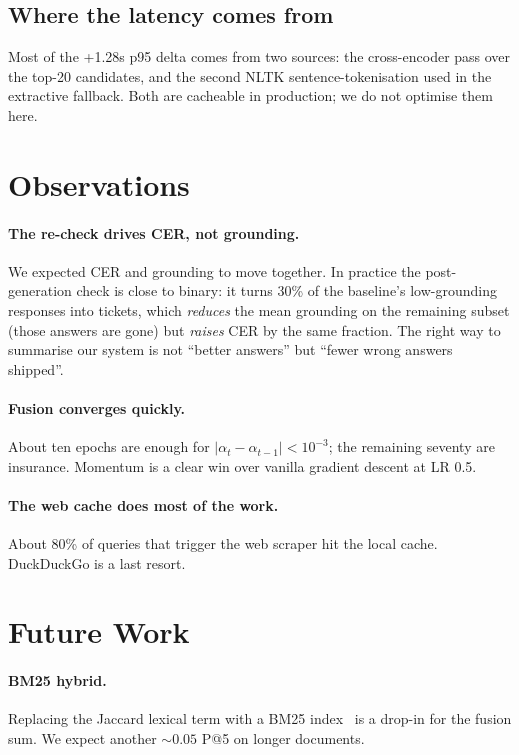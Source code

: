 \documentclass[11pt,a4paper]{article}
\begin{document}
\subsection{Where the latency comes from}
Most of the +1.28s p95 delta comes from two sources: the cross-encoder pass over the top-20 candidates, and the second NLTK sentence-tokenisation used in the extractive fallback. Both are cacheable in production; we do not optimise them here.

\section{Observations}
\paragraph{The re-check drives CER, not grounding.} We expected CER and grounding to move together. In practice the post-generation check is close to binary: it turns 30\% of the baseline's low-grounding responses into tickets, which \emph{reduces} the mean grounding on the remaining subset (those answers are gone) but \emph{raises} CER by the same fraction. The right way to summarise our system is not ``better answers'' but ``fewer wrong answers shipped''.

\paragraph{Fusion converges quickly.} About ten epochs are enough for $|\alpha_t - \alpha_{t-1}| < 10^{-3}$; the remaining seventy are insurance. Momentum is a clear win over vanilla gradient descent at LR 0.5.

\paragraph{The web cache does most of the work.} About 80\% of queries that trigger the web scraper hit the local cache. DuckDuckGo is a last resort.

\section{Future Work}
\paragraph{BM25 hybrid.} Replacing the Jaccard lexical term with a BM25 index~\cite{robertson2009bm25} is a drop-in for the fusion sum. We expect another $\sim$$0.05$ P@5 on longer documents.
\end{document}
